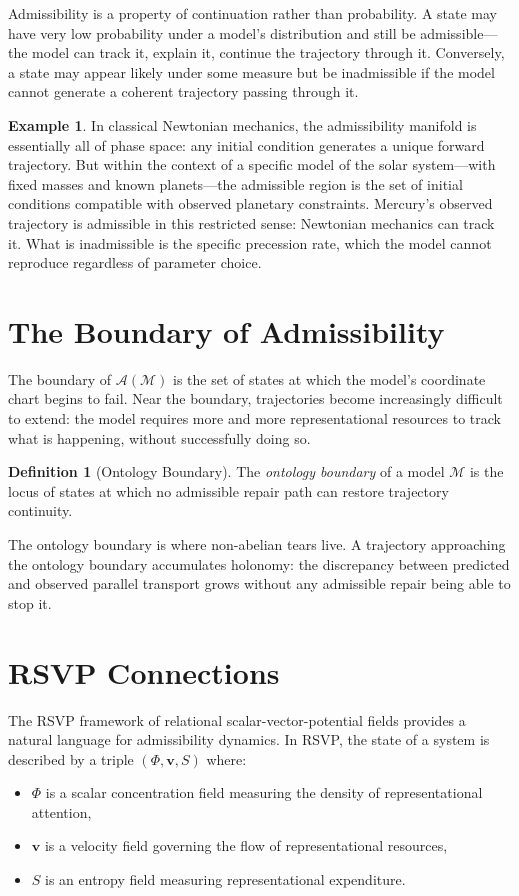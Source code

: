\documentclass[12pt,oneside]{book}
\theoremstyle{plain}
\theoremstyle{definition}
\newtheorem{definition}[theorem]{Definition}
\newtheorem{example}[theorem]{Example}
\theoremstyle{remark}
\newcommand{\M}{\mathcal{M}}
\newcommand{\1}{\mathbf{1}}
\begin{document}
Admissibility is a property of continuation rather than probability. A state may have very low probability under a model's distribution and still be admissible---the model can track it, explain it, continue the trajectory through it. Conversely, a state may appear likely under some measure but be inadmissible if the model cannot generate a coherent trajectory passing through it.

\begin{example}
In classical Newtonian mechanics, the admissibility manifold is essentially all of phase space: any initial condition generates a unique forward trajectory. But within the context of a specific model of the solar system---with fixed masses and known planets---the admissible region is the set of initial conditions compatible with observed planetary constraints. Mercury's observed trajectory is admissible in this restricted sense: Newtonian mechanics can track it. What is inadmissible is the specific precession rate, which the model cannot reproduce regardless of parameter choice.
\end{example}

\section{The Boundary of Admissibility}

The boundary of $\mathcal{A}(\M)$ is the set of states at which the model's coordinate chart begins to fail. Near the boundary, trajectories become increasingly difficult to extend: the model requires more and more representational resources to track what is happening, without successfully doing so.

\begin{definition}[Ontology Boundary]
The \emph{ontology boundary} of a model $\M$ is the locus of states at which no admissible repair path can restore trajectory continuity.
\end{definition}

The ontology boundary is where non-abelian tears live. A trajectory approaching the ontology boundary accumulates holonomy: the discrepancy between predicted and observed parallel transport grows without any admissible repair being able to stop it.

\section{RSVP Connections}

The RSVP framework of relational scalar-vector-potential fields provides a natural language for admissibility dynamics. In RSVP, the state of a system is described by a triple $(\Phi, \mathbf{v}, S)$ where:
\begin{itemize}[noitemsep]
\item $\Phi$ is a scalar concentration field measuring the density of representational attention,
\item $\mathbf{v}$ is a velocity field governing the flow of representational resources,
\item $S$ is an entropy field measuring representational expenditure.
\end{itemize}
\end{document}
